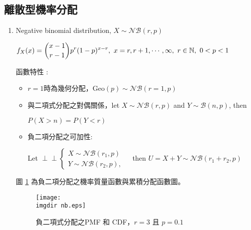 \subsection{離散型機率分配}
\begin{enumerate}
\item
Negative binomial distribution, $X \sim \mathcal{NB}(r, p)$
\vspace{0.2cm}

$\displaystyle f_X(x) = \dbinom{x - 1}{r - 1}p^{r}(1 - p)^{x - r},\,\, x = r, r + 1, \cdots, \infty,\,\, r \in \mathbb{N},\,\, 0 < p < 1$
\vspace{0.2cm}

函數特性 : 
\begin{itemize}
\item
$r = 1$時為幾何分配，Geo$(p) \sim \mathcal{NB}(r = 1, p)$
\item
與二項式分配之對偶關係，let $X \sim \mathcal{NB}(r, p)$ and $Y \sim \mathcal{B}(n, p)$, then 

$P(X > n) = P(Y < r)$
\item
負二項分配之可加性: 

Let $\!\perp\!\!\!\perp 
\left\{\begin{array}{ll} 
X \sim \mathcal{NB}(r_1, p) &\\ 
Y \sim \mathcal{NB}(r_2, p), &
\end{array}\right.$ then $U = X + Y \sim \mathcal{NB}(r_1 + r_2, p)$ 
\end{itemize}

圖 \ref{fig:nb} 為負二項分配之機率質量函數與累積分配函數圖。

\begin{figure}[H]
    \centering
        \texttt{[image: \\imgdir nb.eps]}
    \caption{負二項式分配之PMF 和 CDF，$r = 3$ 且 $p = 0.1$}
    \label{fig:nb}
\end{figure}
\end{enumerate}

